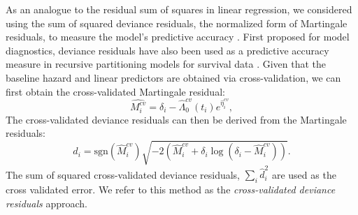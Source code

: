 As an analogue to the residual sum of squares in linear regression, we considered using the sum of squared deviance residuals, the normalized form of Martingale residuals, to measure the model's predictive accuracy \citep{Therneau1990}. First proposed for model diagnostics, deviance residuals have also been used as a predictive accuracy measure in recursive partitioning models for survival data \citep{Therneau2018}. Given that the baseline hazard and linear predictors are obtained via cross-validation, we can first obtain the cross-validated Martingale residual: 
	\begin{equation}
	\hat{M^{cv}_{i}} = \delta_{i} -\hat{\Lambda}^{cv}_{0}(t_{i})e^{\hat{\eta}^{cv}_{i}},
	\end{equation} 
The cross-validated deviance residuals can then be derived from the Martingale residuals: 
	\begin{equation} 
	d_{i} = \text{sgn}(\hat{M}^{cv}_{i})\sqrt{-2(\hat{M}^{cv}_{i} + \delta_{i}\log(\delta_{i} - \hat{M}^{cv}_{i}))}.
	\end{equation}
The sum of squared cross-validated deviance residuals, $\sum_{i}\hat{d}_{i}^2$ are used as the cross validated error. We refer to this method as the \emph{cross-validated deviance residuals} approach.


